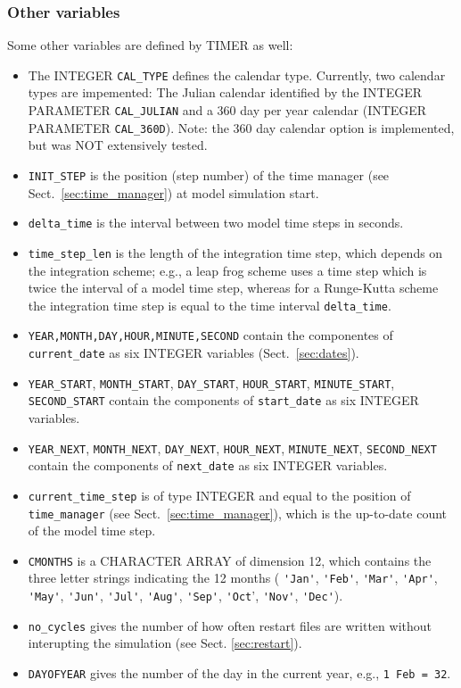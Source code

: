 \documentclass[twoside]{article}
\begin{document}
\subsubsection{Other variables}
\label{sec:others}
%
Some other variables are defined by TIMER as well:
%
\begin{itemize}
\item The {\footnotesize INTEGER} \verb|CAL_TYPE| defines the calendar type.
      Currently, two 
      calendar types are impemented:  The Julian calendar identified by the
      {\footnotesize INTEGER PARAMETER} \verb|CAL_JULIAN| and a 360 day per year
      calendar
      ({\footnotesize INTEGER PARAMETER} \verb|CAL_360D|). Note: the 360 day calendar option
      is implemented, but was NOT extensively tested.
\item \verb|INIT_STEP| is the position (step number) of the time manager (see
      Sect.~\ref{sec:time_manager}) at model simulation start.
\item \verb|delta_time| is the interval between two model time steps in
      seconds.
\item \verb|time_step_len| is the length of the integration time step, which
      depends on the integration scheme; e.g., a leap frog scheme uses a
      time step which is twice the interval of a model time step, whereas for
      a Runge-Kutta scheme the integration time step is equal to the time
      interval \verb|delta_time|.
\item \verb|YEAR,MONTH,DAY,HOUR,MINUTE,SECOND| contain the componentes of 
      \verb|current_date| as six {\footnotesize INTEGER} variables
      (Sect.~\ref{sec:dates}).
\item \verb|YEAR_START|, \verb|MONTH_START|, \verb|DAY_START|,
      \verb|HOUR_START|, \verb|MINUTE_START|, \verb|SECOND_START| contain the
      components of \verb|start_date| as six {\footnotesize INTEGER} variables.
\item \verb|YEAR_NEXT|, \verb|MONTH_NEXT|, \verb|DAY_NEXT|,
      \verb|HOUR_NEXT|, \verb|MINUTE_NEXT|, \verb|SECOND_NEXT| contain the
      components of \verb|next_date| as six {\footnotesize INTEGER} variables.
\item \verb|current_time_step| is of type {\footnotesize INTEGER} and equal to the position of 
      \verb|time_manager| (see Sect.~\ref{sec:time_manager}), which is the
      up-to-date count of the model time step.
\item \verb|CMONTHS| is a {\footnotesize CHARACTER ARRAY}
      of dimension 12, which contains 
      the three letter strings indicating the 12 months 
      ( \verb|'Jan'|, \verb|'Feb'|,
      \verb|'Mar'|, \verb|'Apr'|, \verb|'May'|, \verb|'Jun'|, \verb|'Jul'|, 
      \verb|'Aug'|, \verb|'Sep'|, \verb|'Oct|', \verb|'Nov'|, \verb|'Dec'|).
\item \verb|no_cycles| gives the number of how often restart files are written
      without interupting the simulation (see Sect. \ref{sec:restart}).
\item \verb|DAYOFYEAR| gives the number of the day in the current year, e.g.,
      \verb|1 Feb = 32|.
\end{itemize}
\end{document}
